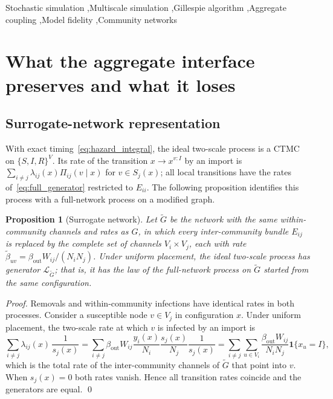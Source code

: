 \documentclass[a4paper,fleqn]{cas-sc}
\newtheorem{proposition}{Proposition}
\newcommand{\ind}{\mathbf{1}}
\begin{document}
\begin{keywords}
Stochastic simulation \sep Multiscale simulation \sep Gillespie algorithm \sep Aggregate coupling \sep Model fidelity \sep Community networks
\end{keywords}

\maketitle

\clearpage


\clearpage
\section{What the aggregate interface preserves and what it loses}
\label{sec:analysis}

\subsection{Surrogate-network representation}
\label{sec:surrogate}

With exact timing~\eqref{eq:hazard_integral}, the ideal two-scale process is a CTMC on $\{S,I,R\}^V$. Its rate of the transition $x\to x^{v:I}$ by an import is $\sum_{i\neq j}\lambda_{ij}(x)\Pi_{ij}(v\mid x)$ for $v\in S_j(x)$; all local transitions have the rates of~\eqref{eq:full_generator} restricted to $E_{ii}$. The following proposition identifies this process with a full-network process on a modified graph.

\begin{proposition}[Surrogate network]
\label{prop:surrogate}
Let $\tilde G$ be the network with the same within-community channels and rates as $G$, in which every inter-community bundle $E_{ij}$ is replaced by the complete set of channels $V_i\times V_j$, each with rate $\tilde\beta_{uv}=\beta_{\mathrm{out}}W_{ij}/(N_iN_j)$. Under uniform placement, the ideal two-scale process has generator $\mathcal{L}_{\tilde G}$; that is, it has the law of the full-network process on $\tilde G$ started from the same configuration.
\end{proposition}

\begin{proof}
Removals and within-community infections have identical rates in both processes. Consider a susceptible node $v\in V_j$ in configuration $x$. Under uniform placement, the two-scale rate at which $v$ is infected by an import is
\[
\sum_{i\neq j}\lambda_{ij}(x)\,\frac{1}{s_j(x)}
=\sum_{i\neq j}\beta_{\mathrm{out}}W_{ij}\frac{y_i(x)}{N_i}\frac{s_j(x)}{N_j}\frac{1}{s_j(x)}
=\sum_{i\neq j}\sum_{u\in V_i}\frac{\beta_{\mathrm{out}}W_{ij}}{N_iN_j}\ind\{x_u=I\},
\]
which is the total rate of the inter-community channels of $\tilde G$ that point into $v$. When $s_j(x)=0$ both rates vanish. Hence all transition rates coincide and the generators are equal. \qed
\end{proof}
\end{document}
